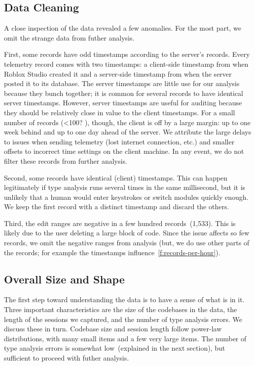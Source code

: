 \documentclass[english,submission,cleveref]{programming}
\begin{document}
\subsection{Data Cleaning}
\label{s:data-cleaning}

A close inspection of the data revealed a few anomalies.
For the most part, we omit the strange data from futher analysis.

First, some records have odd timestamps according to the server's records.
Every telemetry record comes with two timestamps: a client-side timestamp
from when Roblox Studio created it and a server-side timestamp from when
the server posted it to its database.
The server timestamps are little use for our analysis because they bunch
together; it is common for several records to have identical server
timestamps.
However, server timestamps are useful for auditing because they should
be relatively close in value to the client timestamps.
For a small number of records (<100? \FILL{}), though, the client is off by a large
margin: up to one week behind and up to one day ahead of the server.
We attribute the large delays to issues when sending telemetry (lost internet
connection, etc.) and smaller offsets to incorrect time settings on the client
machine.
In any event, we do not filter these records from further analysis.

Second, some records have identical (client) timestamps.
This can happen legitimately if type analysis runs several times
in the same millisecond, but it is unlikely that a human would
enter keystrokes or switch modules quickly enough.
We keep the first record with a distinct timestamp and discard the others.

Third, the edit ranges are negative in a few hundred records~(1,533).
This is likely due to the user deleting a large block of code.
Since the issue affects so few records, we omit the negative ranges
from analysis (but, we do use other parts of the records; for example
the timestamps influence~\cref{f:records-per-hour}).

\subsection{Overall Size and Shape}

The first step toward understanding the data is to have a sense of what
is in it.
Three important characteristics are the size of the codebases in the data,
the length of the sessions we captured, and the number of type analysis
errors.
We discuss these in turn.
Codebase size and session length follow power-law distributions, with
many small items and a few very large items.
The number of type analysis errors is somewhat low~(explained in the next
section), but sufficient to proceed with futher analysis.
\end{document}
